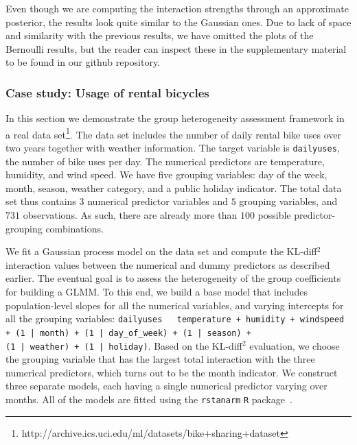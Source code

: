 \documentclass{article}
\begin{document}
Even though we are computing the interaction strengths through an approximate posterior, the results look quite similar to the Gaussian ones.
%
Due to lack of space and similarity with the previous results, we have omitted the plots of the Bernoulli
results, but the reader can inspect these in the supplementary material to be found in our github repository.
%

\subsubsection{Case study: Usage of rental bicycles} \label{sec:bikedata}

%
%
%
%
%
%
%
%
%
%
%
%
%
%

In this section we demonstrate the group heterogeneity assessment framework in a real data set\footnote{http://archive.ics.uci.edu/ml/datasets/bike+sharing+dataset}. The data set
includes the number of daily rental bike uses over two years together with weather information.
The target variable is \texttt{dailyuses}, the number of bike uses per day.
The numerical predictors are temperature, humidity, and wind speed.
We have five grouping variables:
day of the week, month, season, weather category, and a public holiday indicator.
%
%
%
%
%
%
The total data set thus contains  $3$ numerical predictor
variables and $5$ grouping variables, and $731$ observations.
As such, there are already more than $100$ possible predictor-grouping combinations.
%



%
%
%
%
%
%
%
%
%
%
%
%
%
%




We fit a Gaussian process model on the data set and compute the KL-diff$^2$ interaction values between
the numerical and dummy predictors as described earlier.
The eventual goal is to assess the heterogeneity
of the group coefficients for building a GLMM.
%
%
%
To this end, we build
a base model that includes population-level slopes for all the numerical
variables, and varying intercepts for all the grouping variables:
\texttt{dailyuses \texttildelow \, temperature + humidity + windspeed + (1 | month) + (1 | day\_of\_week) + (1 | season) +\\ (1 | weather) + (1 | holiday)}.
Based on the KL-diff$^2$ evaluation, we choose the grouping variable that has the largest total interaction with
the three numerical predictors, which turns out to be the month indicator.
We construct three separate models, each having a single numerical predictor varying over months.
All of the models are fitted using the \texttt{rstanarm} \texttt{R} package~\cite{rstanarm}.
%
%
%
\end{document}
